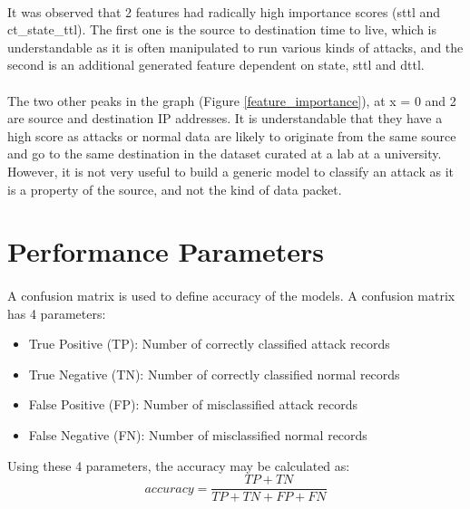 \paragraph{}
It was observed that 2 features had radically high importance scores (sttl and ct\_state\_ttl). The first one is the source to destination time to live, which is understandable as it is often manipulated to run various kinds of attacks, and the second is an additional generated feature dependent on state, sttl and dttl.

\paragraph{}
The two other peaks in the graph (Figure \ref{feature_importance}), at x = 0 and 2 are source and destination IP addresses. It is understandable that they have a high score as attacks or normal data are likely to originate from the same source and go to the same destination in the dataset curated at a lab at a university. However, it is not very useful to build a generic model to classify an attack as it is a property of the source, and not the kind of data packet.

\section{Performance Parameters}
\paragraph{}
A confusion matrix is used to define accuracy of the models. A confusion matrix has 4 parameters:
\begin{itemize}
    \item True Positive (TP): Number of correctly classified attack records
    \item True Negative (TN): Number of correctly classified normal records
    \item False Positive (FP): Number of misclassified attack records
    \item False Negative (FN): Number of misclassified normal records
\end{itemize}
Using these 4 parameters, the accuracy may be calculated as:
\begin{equation}
    accuracy = \frac {TP + TN} {TP + TN + FP + FN}
\end{equation}

